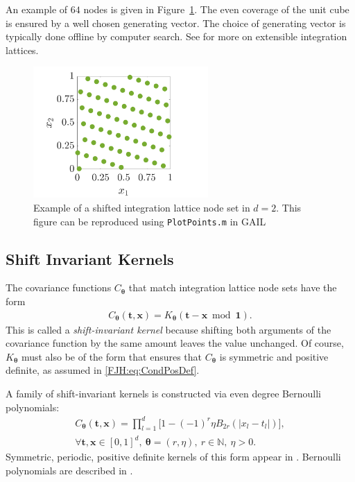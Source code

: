 \documentclass[twocolumn]{svjour3}          %
\newcommand{\bm}[1]{\boldsymbol{#1}}
\newcommand{\naturals}{\mathbb{N}}
\newcommand{\vtheta}{{\bm{\theta}}}
\newcommand{\vt}{\bm{t}}
\newcommand{\vx}{\bm{x}}
\newcommand{\vone}{\bm{1}}
\newcommand{\code}[1]{\texttt{#1}}
\newcommand\figref{Figure~\ref}
\begin{document}
An example of $64$ nodes is given in \figref{latticefig}.  The even coverage of the unit cube is ensured by a well chosen generating vector.  The choice of generating vector is typically done offline by computer search.  See \cite{DicEtal14a,HicNie03a} for more on extensible integration lattices.
\begin{figure}[htp]
	\centering
	\includegraphics[height=5cm]{ShiftedLatticePoints}
	\caption{Example of a shifted integration lattice node set  in $d=2$. 
	This figure can be reproduced using \code{PlotPoints.m} in GAIL} \label{latticefig}
\end{figure}

\subsection{Shift Invariant Kernels}
The covariance functions $C_\vtheta$ that match integration lattice node sets have the form
\begin{align} \label{eq:shInv}
C_\vtheta(\vt,\vx) = K_\vtheta(\vt - \vx \bmod \vone).
\end{align}
This is called a \emph{shift-invariant kernel} because shifting both arguments of the covariance function by the same amount leaves the value unchanged.   Of course, $K_\vtheta$ must also be of the form that ensures that $C_\vtheta$ is symmetric and positive definite, as assumed in \eqref{FJH:eq:CondPosDef}. 

A family of shift-invariant kernels is constructed via even degree Bernoulli polynomials:
\begin{multline}
\label{the_kernel_eqn_bernoulli}
C_\vtheta(\vt, \vx) =
\prod_{l=1}^d \biggl[
1 - (-1)^{r} \eta B_{2r}( |{x_l-t_l}| ) \biggr], \\  
\forall \vt,\vx \in [0,1]^d, \  \vtheta = (r,\eta), \ r \in \naturals, \ \eta > 0.
\end{multline}
Symmetric, periodic, positive definite kernels of this form appear in  \cite{DicEtal14a,Hic96a}.  Bernoulli polynomials are described in \cite[Chapter 24]{OlvEtal10a}.
\end{document}
